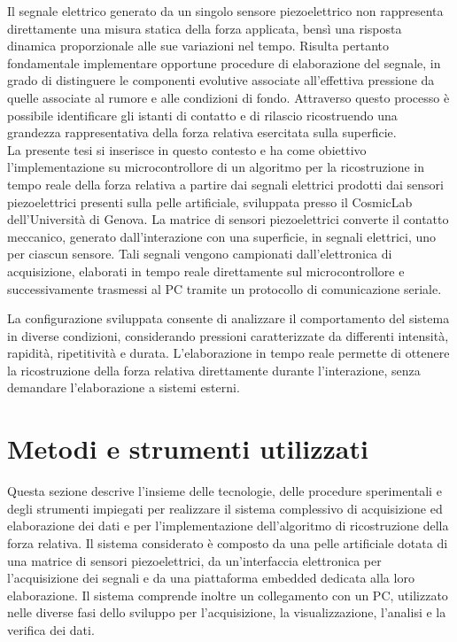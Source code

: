 \documentclass[10pt, a4paper]{article}
\begin{document}
        Il segnale elettrico generato da un singolo sensore piezoelettrico non rappresenta direttamente una misura statica della forza applicata, bensì una risposta dinamica proporzionale alle sue variazioni nel tempo.
        Risulta pertanto fondamentale implementare opportune procedure di elaborazione del segnale, in grado di distinguere le componenti evolutive associate all'effettiva pressione da quelle associate al rumore e alle 
        condizioni di fondo. Attraverso questo processo è possibile identificare gli istanti di contatto e di rilascio ricostruendo una grandezza rappresentativa della forza relativa esercitata 
        sulla superficie.\\

        La presente tesi si inserisce in questo contesto e ha come obiettivo l'implementazione su microcontrollore di un algoritmo per la ricostruzione in tempo reale della
        forza relativa a partire dai segnali elettrici prodotti dai sensori piezoelettrici presenti sulla pelle artificiale, sviluppata presso il CosmicLab dell'Università di Genova. 
        La matrice di sensori piezoelettrici converte il contatto meccanico, generato dall'interazione con una superficie, in segnali elettrici, uno per ciascun sensore. Tali segnali vengono 
        campionati dall'elettronica di acquisizione, elaborati in tempo reale direttamente sul microcontrollore e successivamente trasmessi al PC tramite un protocollo di comunicazione seriale.

        La configurazione sviluppata consente di analizzare il comportamento del sistema in diverse condizioni, considerando pressioni caratterizzate da differenti 
        intensità, rapidità, ripetitività e durata. L'elaborazione in tempo reale permette di ottenere la ricostruzione della forza relativa direttamente durante l'interazione, senza demandare 
        l'elaborazione a sistemi esterni. 
    
    \section{Metodi e strumenti utilizzati}
        Questa sezione descrive l'insieme delle tecnologie, delle procedure sperimentali e degli strumenti impiegati per realizzare il sistema complessivo di acquisizione ed elaborazione dei dati
        e per l'implementazione dell'algoritmo di ricostruzione della forza relativa. 
        Il sistema considerato è composto da una pelle artificiale dotata di una matrice di sensori 
        piezoelettrici, da un'interfaccia elettronica per l'acquisizione dei segnali e da una piattaforma embedded dedicata alla loro elaborazione. Il sistema comprende inoltre un collegamento con un PC,
        utilizzato nelle diverse fasi dello sviluppo per l'acquisizione, la visualizzazione, l'analisi e la verifica dei dati.
\end{document}
